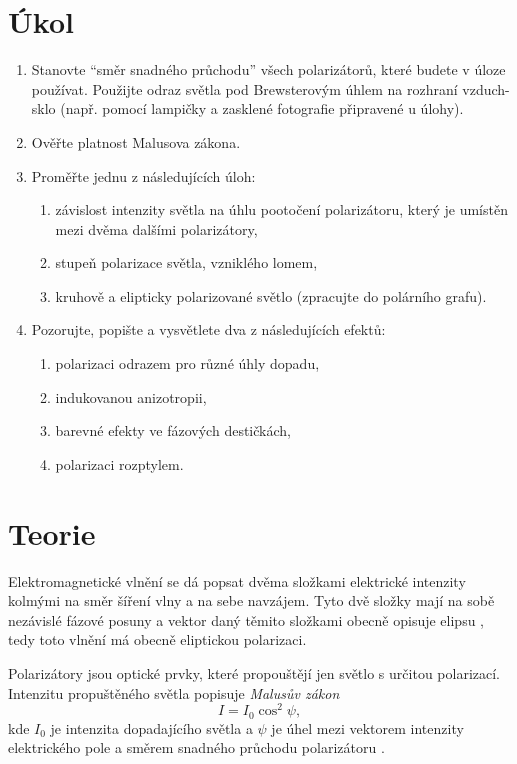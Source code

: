 \documentclass{protokol}
\begin{document}
  \section*{Úkol}

    \begin{enumerate}
      \item Stanovte ``směr snadného průchodu'' všech polarizátorů, které budete v úloze používat. Použijte odraz světla pod Brewsterovým úhlem na rozhraní vzduch-sklo (např. pomocí lampičky a zasklené fotografie připravené u úlohy).
      \item Ověřte platnost Malusova zákona.
      \item Proměřte jednu z následujících úloh:
      \begin{enumerate}
        \item závislost intenzity světla na úhlu pootočení polarizátoru, který je umístěn mezi dvěma dalšími polarizátory,
        \item stupeň polarizace světla, vzniklého lomem,
        \item kruhově a elipticky polarizované světlo (zpracujte do polárního grafu).
      \end{enumerate}
      \item Pozorujte, popište a vysvětlete dva z následujících efektů:
      \begin{enumerate}
        \item polarizaci odrazem pro různé úhly dopadu,
        \item indukovanou anizotropii,
        \item barevné efekty ve fázových destičkách,
        \item polarizaci rozptylem.
      \end{enumerate}
    \end{enumerate}

  \section*{Teorie}

    Elektromagnetické vlnění se dá popsat dvěma složkami elektrické intenzity kolmými na směr šíření vlny a na sebe navzájem. Tyto dvě složky mají na sobě nezávislé fázové posuny a vektor daný těmito složkami obecně opisuje elipsu \cite{teorie}, tedy toto vlnění má obecně eliptickou polarizaci.

    Polarizátory jsou optické prvky, které propouštějí jen světlo s určitou polarizací. Intenzitu propuštěného světla popisuje \textit{Malusův zákon}
    \begin{equation} \label{eq:malus}
      I = I_0 \cos^2 \psi,
    \end{equation}
    kde $I_0$ je intenzita dopadajícího světla a $\psi$ je úhel mezi vektorem intenzity elektrického pole a směrem snadného průchodu polarizátoru \cite{teorie}.
\end{document}
